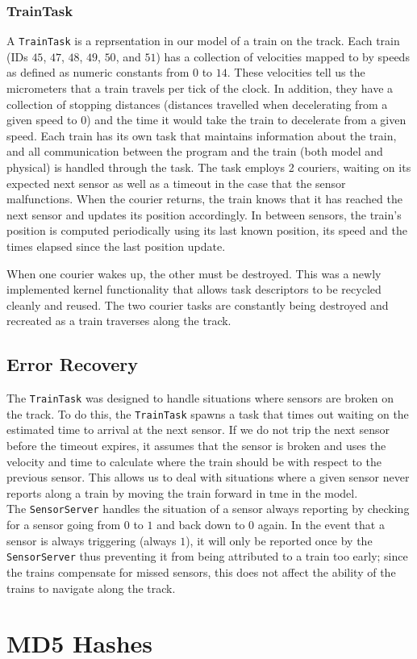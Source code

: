 \documentclass[12pt]{article}
\begin{document}
\subsubsection{TrainTask}
A {\tt TrainTask} is a reprsentation in our model of a train on the track.  Each train (IDs $45$, $47$, $48$, $49$, $50$, and $51$) has a collection of velocities mapped to by speeds as defined as numeric constants from $0$ to $14$.  These velocities tell us the micrometers that a train travels per tick of the clock.  In addition, they have a collection of stopping distances (distances travelled when decelerating from a given speed to $0$) and the time it would take the train to decelerate from a given speed.  Each train has its own task that maintains information about the train, and all communication between the program and the train (both model and physical) is handled through the task. The task employs 2 couriers, waiting on its expected next sensor as well as a timeout in the case that the sensor malfunctions. When the courier returns, the train knows that it has reached the next sensor and updates its position accordingly. In between sensors, the train's position is
computed periodically using its last known position, its speed and the times elapsed since the last position update.

When one courier wakes up, the other must be destroyed. This was a newly implemented kernel functionality that allows
task descriptors to be recycled cleanly and reused. The two courier tasks are constantly being destroyed and recreated
as a train traverses along the track.
\\[1\baselineskip]
\subsection{Error Recovery}
The {\tt TrainTask} was designed to handle situations where sensors are broken on the track.  To do this, the {\tt TrainTask} spawns a task that times out waiting on the estimated time to arrival at the next sensor.  If we do not trip the next sensor before the timeout expires, it assumes that the sensor is broken and uses the velocity and time to calculate where the train should be with respect to the previous sensor.  This allows us to deal with situations where a given sensor never reports along a train by moving the train forward in tme in the model.
\\
The {\tt SensorServer} handles the situation of a sensor always reporting by checking for a sensor going from $0$ to $1$ and back down to $0$ again.  In the event that a sensor is always triggering (always $1$), it will only be reported once by the {\tt SensorServer} thus preventing it from being attributed to a train too early; since the trains compensate for missed sensors, this does not affect the ability of the trains to navigate along the track.
\\[2\baselineskip]
\section{MD5 Hashes}

\end{document}
